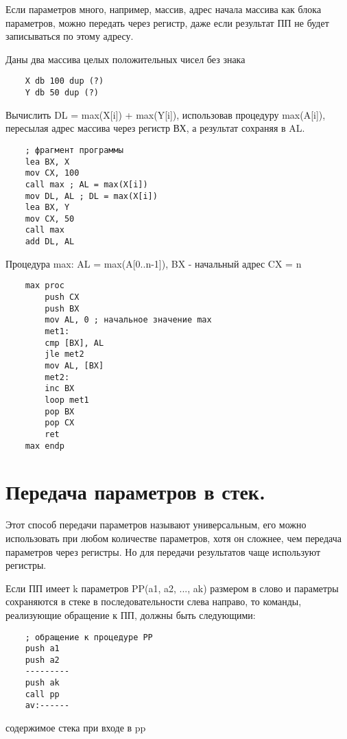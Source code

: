 Если параметров много, например, массив, адрес начала массива как блока параметров, можно передать через регистр, даже если результат ПП не будет записываться по этому адресу.

Даны два массива целых положительных чисел без знака
\begin{verbatim}
    X db 100 dup (?)
    Y db 50 dup (?)
\end{verbatim}

Вычислить DL = max(X[i]) + max(Y[i]), использовав процедуру max(A[i]), пересылая адрес массива через регистр ВХ, а результат сохраняя в AL.
\begin{verbatim}
    ; фрагмент программы
    lea BX, X
    mov CX, 100
    call max ; AL = max(X[i])
    mov DL, AL ; DL = max(X[i])
    lea BX, Y
    mov CX, 50
    call max
    add DL, AL
\end{verbatim}

Процедура max: AL = max(A[0..n-1]), BX - начальный адрес CX = n

\begin{verbatim}
    max proc
        push CX
        push BX
        mov AL, 0 ; начальное значение max
        met1:
        cmp [BX], AL
        jle met2
        mov AL, [BX]
        met2:
        inc BX
        loop met1
        pop BX
        pop CX
        ret
    max endp
\end{verbatim}

\section{Передача параметров в стек.}

Этот способ передачи параметров называют универсальным, его можно использовать при любом количестве параметров, хотя он сложнее, чем передача параметров через регистры.
Но для передачи результатов чаще используют регистры.

Если ПП имеет k параметров PP(a1, a2, ..., ak) размером в слово и параметры сохраняются в стеке в последовательности слева направо, то команды, реализующие обращение к ПП, должны быть следующими:

\begin{verbatim}
    ; обращение к процедуре PP
    push a1
    push a2
    ---------
    push ak
    call pp
    av:------
\end{verbatim}

содержимое стека при входе в pp
\begin{figure}
\end{figure}

